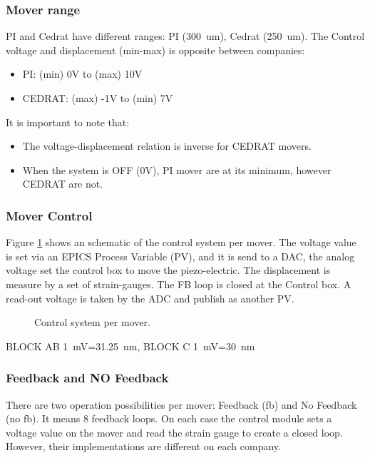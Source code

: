 \subsubsection{Mover range}
PI and Cedrat have different ranges: PI (300~um), Cedrat (250~um). The Control voltage and displacement (min-max) is opposite between companies:\par
\begin{itemize}
\item PI: 		(min)   0V   	to 	(max) 10V
\item CEDRAT: 	(max) -1V 	to	(min)    7V
\end{itemize}
It is important to note that:
\begin{itemize}
\item The voltage-displacement relation is inverse for CEDRAT movers.
\item When the system is OFF (0V), PI mover are at its minimum, however CEDRAT are not.
\end{itemize}
\subsubsection{Mover Control}
Figure \ref{f:movercontrol} shows an schematic of the control system per mover. The voltage value is set via an EPICS Process Variable (PV), and it is send to a DAC, the analog voltage set the control box to move the piezo-electric. The displacement is measure by a set of strain-gauges. The FB loop is closed at the Control box. A read-out voltage is taken by the ADC and publish as another PV.\par
\begin{figure}[hbt]
\centering
{}\caption{Control system per mover.}\label{f:movercontrol}
\end{figure}
{\tiny BLOCK AB 1~mV=31.25~nm, BLOCK C 1~mV=30~nm}\par
\subsubsection{Feedback and NO Feedback}
There are two operation possibilities per mover: Feedback (fb) and No Feedback (no fb). It means 8 feedback loops. On each case the control module sets a voltage value on the mover and read the strain gauge to create a closed loop. However, their implementations are different on each company.
